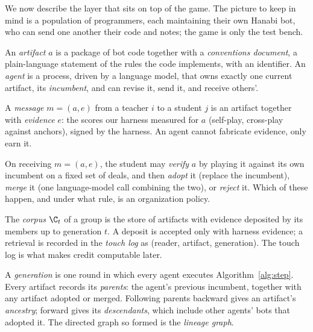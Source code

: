 \documentclass[11pt]{article}
\numberwithin{theorem}{section}
\theoremstyle{definition}
\theoremstyle{problemstyle}
\begin{document}
We now describe the layer that sits on top of the game. The picture to keep in mind is a population of programmers,
each maintaining their own Hanabi bot, who can send one another their code and notes; the game is only the test bench.

\begin{definition}
An \emph{artifact} $a$ is a package of bot code together with a \emph{conventions document}, a plain-language
statement of the rules the code implements, with an identifier. An \emph{agent} is a process, driven by a language
model, that owns exactly one current artifact, its \emph{incumbent}, and can revise it, send it, and receive others'.
\end{definition}

\begin{definition}
A \emph{message} $m=(a,e)$ from a teacher $i$ to a student $j$ is an artifact together with \emph{evidence} $e$: the
scores our harness measured for $a$ (self-play, cross-play against anchors), signed by the harness. An agent cannot
fabricate evidence, only earn it.
\end{definition}

\begin{definition}
On receiving $m=(a,e)$, the student may \emph{verify} $a$ by playing it against its own incumbent on a fixed set of
deals, and then \emph{adopt} it (replace the incumbent), \emph{merge} it (one language-model call combining the two),
or \emph{reject} it. Which of these happen, and under what rule, is an organization policy.
\end{definition}

\begin{definition}
The \emph{corpus} $\C_t$ of a group is the store of artifacts with evidence deposited by its members up to generation
$t$. A deposit is accepted only with harness evidence; a retrieval is recorded in the \emph{touch log} as (reader,
artifact, generation). The touch log is what makes credit computable later.
\end{definition}

\begin{definition}
A \emph{generation} is one round in which every agent executes Algorithm~\ref{alg:step}. Every artifact records its
\emph{parents}: the agent's previous incumbent, together with any artifact adopted or merged. Following parents
backward gives an artifact's \emph{ancestry}; forward gives its \emph{descendants}, which include other agents' bots
that adopted it. The directed graph so formed is the \emph{lineage graph}.
\end{definition}
\end{document}
